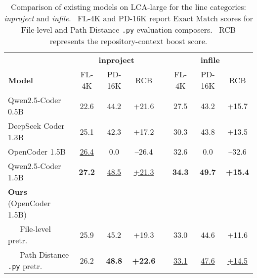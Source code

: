 \begin{table}[t]
\caption{ 
    Comparison of existing models on LCA-large for the line categories: \textit{inproject} and \textit{infile}. \ FL-4K and PD-16K report Exact Match scores for File-level and Path Distance \texttt{.py} evaluation composers. \ RCB represents the repository-context boost score. 
}
\label{tab:sota-comparison}
\begin{center}
\begin{tabular}{l ccc c ccc}
\toprule
 & \multicolumn{3}{c}{\bf inproject} & & \multicolumn{3}{c}{\bf infile} \\\cmidrule(lr){2-4}\cmidrule(lr){6-8}
 \bf Model               & FL-4K   & PD-16K & RCB & & FL-4K & PD-16K & RCB \\ 
\midrule
Qwen2.5-Coder 0.5B       & 22.6 & 44.2 & +21.6  & & 27.5 & 43.2 & +15.7 \\\cmidrule(lr){1-1} \cmidrule(lr){2-4}\cmidrule(lr){6-8}
DeepSeek Coder 1.3B      & 25.1 & 42.3 & +17.2 & & 30.3 & 43.8 & +13.5 \\
OpenCoder 1.5B           & \underline{26.4} & 0.0 & --26.4   & & 32.6 & 0.0 & --32.6 \\
Qwen2.5-Coder 1.5B       & \textbf{27.2} & \underline{48.5} & \underline{+21.3} & & \textbf{34.3} & \textbf{49.7} & \textbf{+15.4} \\ 

\textbf{Ours} (OpenCoder 1.5B)         &  & & & & \\
~~~File-level pretr.      & 25.9 & 45.2 & +19.3 & & 33.0 & 44.6 & +11.6 \\ 
~~~Path Distance \texttt{.py} pretr.   & 26.2 & \textbf{48.8} & \textbf{+22.6} & & \underline{33.1} & \underline{47.6} & \underline{+14.5} \\
\bottomrule
\end{tabular}
\end{center}
\end{table}